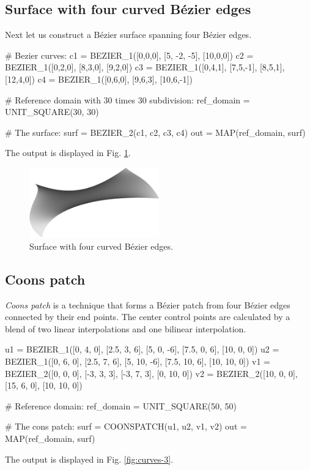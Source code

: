 \subsection{Surface with four curved B\'ezier edges}

Next let us construct a B\'ezier surface spanning four 
B\'ezier edges. 

\begin{bluecode}
# Bezier curves:
c1 = BEZIER_1([0,0,0], [5, -2, -5], [10,0,0])
c2 = BEZIER_1([0,2,0], [8,3,0], [9,2,0])
c3 = BEZIER_1([0,4,1], [7,5,-1], [8,5,1], [12,4,0])
c4 = BEZIER_1([0,6,0], [9,6,3], [10,6,-1])

# Reference domain with 30 times 30 subdivision:
ref_domain = UNIT_SQUARE(30, 30)

# The surface:
surf = BEZIER_2(c1, c2, c3, c4)
out = MAP(ref_domain, surf)
\end{bluecode}
The output is displayed in Fig. \ref{fig:bezi}.

\begin{figure}[!ht]
\begin{center}
\includegraphics[width=0.5\textwidth]{img/bezi.png}
\end{center}
\vspace{-4mm}
\caption{Surface with four curved B\'ezier edges.}
\label{fig:bezi}
\end{figure}

\subsection{Coons patch}

{\em Coons patch} is a technique that forms a B\'ezier patch from four B\'ezier edges connected 
by their end points. The center control 
points are calculated by a blend of two linear interpolations and one bilinear interpolation.

\begin{bluecode}
u1 = BEZIER_1([0, 4, 0], [2.5, 3, 6], [5, 0, -6], [7.5, 0, 6], 
[10, 0, 0])
u2 = BEZIER_1([0, 6, 0], [2.5, 7, 6], [5, 10, -6], [7.5, 10, 6], 
[10, 10, 0])
v1 = BEZIER_2([0, 0, 0], [-3, 3, 3], [-3, 7, 3], [0, 10, 0])
v2 = BEZIER_2([10, 0, 0], [15, 6, 0], [10, 10, 0])

# Reference domain:
ref_domain = UNIT_SQUARE(50, 50)

# The cons patch:
surf = COONSPATCH(u1, u2, v1, v2)
out = MAP(ref_domain, surf)
\end{bluecode}
The output is displayed in Fig. \ref{fig:curves-3}.

